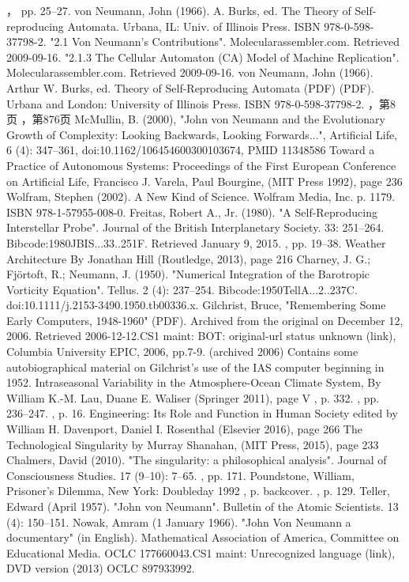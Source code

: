 \begin{enumerate}
， pp. 25–27.
von Neumann, John (1966). A. Burks, ed. The Theory of Self-reproducing Automata. Urbana, IL: Univ. of Illinois Press. ISBN 978-0-598-37798-2.
"2.1 Von Neumann's Contributions". Molecularassembler.com. Retrieved 2009-09-16.
"2.1.3 The Cellular Automaton (CA) Model of Machine Replication". Molecularassembler.com. Retrieved 2009-09-16.
von Neumann, John (1966). Arthur W. Burks, ed. Theory of Self-Reproducing Automata (PDF) (PDF). Urbana and London: University of Illinois Press. ISBN 978-0-598-37798-2.
，第8页
，第876页
McMullin, B. (2000), "John von Neumann and the Evolutionary Growth of Complexity: Looking Backwards, Looking Forwards...", Artificial Life, 6 (4): 347–361, doi:10.1162/106454600300103674, PMID 11348586
Toward a Practice of Autonomous Systems: Proceedings of the First European Conference on Artificial Life, Francisco J. Varela, Paul Bourgine, (MIT Press 1992), page 236
Wolfram, Stephen (2002). A New Kind of Science. Wolfram Media, Inc. p. 1179. ISBN 978-1-57955-008-0.
Freitas, Robert A., Jr. (1980). "A Self-Reproducing Interstellar Probe". Journal of the British Interplanetary Society. 33: 251–264. Bibcode:1980JBIS...33..251F. Retrieved January 9, 2015.
, pp. 19–38.
Weather Architecture By Jonathan Hill (Routledge, 2013), page 216
Charney, J. G.; Fjörtoft, R.; Neumann, J. (1950). "Numerical Integration of the Barotropic Vorticity Equation". Tellus. 2 (4): 237–254. Bibcode:1950TellA...2..237C. doi:10.1111/j.2153-3490.1950.tb00336.x.
Gilchrist, Bruce, "Remembering Some Early Computers, 1948-1960" (PDF). Archived from the original on December 12, 2006. Retrieved 2006-12-12.CS1 maint: BOT: original-url status unknown (link), Columbia University EPIC, 2006, pp.7-9. (archived 2006) Contains some autobiographical material on Gilchrist's use of the IAS computer beginning in 1952.
Intraseasonal Variability in the Atmosphere-Ocean Climate System, By William K.-M. Lau, Duane E. Waliser (Springer 2011), page V
, p. 332.
, pp. 236–247.
, p. 16.
Engineering: Its Role and Function in Human Society edited by William H. Davenport, Daniel I. Rosenthal (Elsevier 2016), page 266
The Technological Singularity by Murray Shanahan, (MIT Press, 2015), page 233
Chalmers, David (2010). "The singularity: a philosophical analysis". Journal of Consciousness Studies. 17 (9–10): 7–65.
, pp. 171.
Poundstone, William, Prisoner's Dilemma, New York: Doubleday 1992
, p. backcover.
, p. 129.
Teller, Edward (April 1957). "John von Neumann". Bulletin of the Atomic Scientists. 13 (4): 150–151.
Nowak, Amram (1 January 1966). "John Von Neumann a documentary" (in English). Mathematical Association of America, Committee on Educational Media. OCLC 177660043.CS1 maint: Unrecognized language (link), DVD version (2013) OCLC 897933992.

\end{enumerate}
